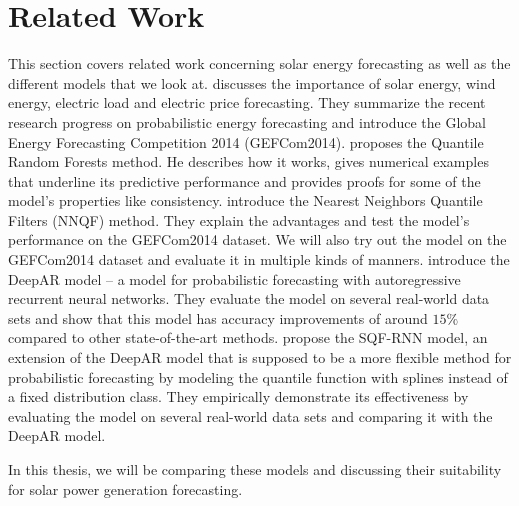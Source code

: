 \section{Related Work}
\label{sec:related-work}

This section covers related work concerning solar energy forecasting as well as 
the different models that we look at. 
\Textcite{Hong2016} discusses the importance of solar energy, wind energy, electric load 
and electric price forecasting. They summarize the recent research progress on probabilistic 
energy forecasting and introduce the Global Energy Forecasting Competition 2014 (GEFCom2014).
\Textcite{Meinshausen2006} proposes the Quantile Random Forests method. He describes 
how it works, gives numerical examples that underline its predictive performance
and provides proofs for some of the model's properties like consistency. 
\Textcite{Ordiano2019} introduce the Nearest Neighbors Quantile Filters (NNQF) method. 
They explain the advantages and test the model's performance on the GEFCom2014 dataset. 
We will also try out the model on the GEFCom2014 dataset and evaluate 
it in multiple kinds of manners.
\Textcite{Salinas2017} introduce the DeepAR model -- a model for probabilistic forecasting 
with autoregressive recurrent neural networks. They evaluate the model on several 
real-world data sets and show that this model has accuracy improvements of around 
\(15\%\) compared to other state-of-the-art methods.
\Textcite{Gasthaus2019} propose the SQF-RNN model, an extension of the DeepAR model 
that is supposed to be a more flexible method for probabilistic forecasting 
by modeling the quantile function with splines instead of a fixed distribution class.
They empirically demonstrate its effectiveness by evaluating the model on several real-world 
data sets and comparing it with the DeepAR model.

In this thesis, we will be comparing these models and discussing 
their suitability for solar power generation forecasting.